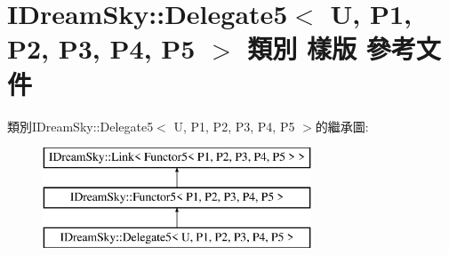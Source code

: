 \hypertarget{class_i_dream_sky_1_1_delegate5}{}\section{I\+Dream\+Sky\+:\+:Delegate5$<$ U, P1, P2, P3, P4, P5 $>$ 類別 樣版 參考文件}
\label{class_i_dream_sky_1_1_delegate5}
類別\+I\+Dream\+Sky\+:\+:Delegate5$<$ U, P1, P2, P3, P4, P5 $>$的繼承圖\+:\begin{figure}[H]
\begin{center}
\leavevmode
\includegraphics[height=3.000000cm]{class_i_dream_sky_1_1_delegate5}
\end{center}
\end{figure}
